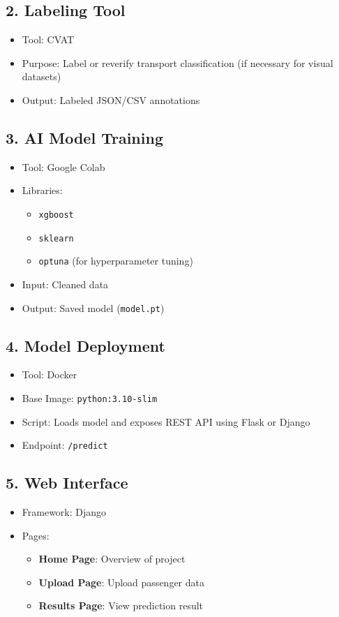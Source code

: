 \documentclass[12pt]{article}
\begin{document}
\subsection{2. Labeling Tool}
\begin{itemize}
    \item Tool: CVAT
    \item Purpose: Label or reverify transport classification (if necessary for visual datasets)
    \item Output: Labeled JSON/CSV annotations
\end{itemize}

\subsection{3. AI Model Training}
\begin{itemize}
    \item Tool: Google Colab
    \item Libraries:
    \begin{itemize}
        \item \texttt{xgboost}
        \item \texttt{sklearn}
        \item \texttt{optuna} (for hyperparameter tuning)
    \end{itemize}
    \item Input: Cleaned data
    \item Output: Saved model (\texttt{model.pt})
\end{itemize}

\subsection{4. Model Deployment}
\begin{itemize}
    \item Tool: Docker
    \item Base Image: \texttt{python:3.10-slim}
    \item Script: Loads model and exposes REST API using Flask or Django
    \item Endpoint: \texttt{/predict}
\end{itemize}

\subsection{5. Web Interface}
\begin{itemize}
    \item Framework: Django
    \item Pages:
    \begin{itemize}
        \item \textbf{Home Page}: Overview of project
        \item \textbf{Upload Page}: Upload passenger data
        \item \textbf{Results Page}: View prediction result
    \end{itemize}
\end{itemize}
\end{document}
